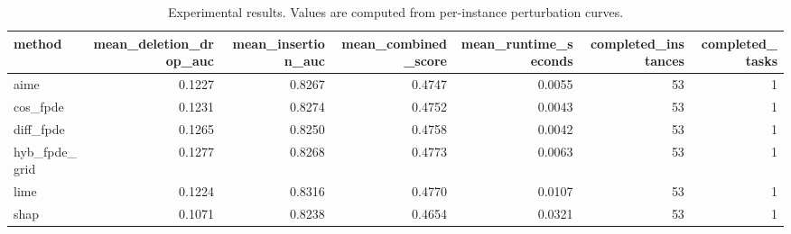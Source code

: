 \begin{table}[t]
\caption{Experimental results. Values are computed from per-instance perturbation curves.}
\label{tab:main_results_computed}
\centering
\begin{tabular}{lrrrrrr}
\toprule
method & mean\_deletion\_drop\_auc & mean\_insertion\_auc & mean\_combined\_score & mean\_runtime\_seconds & completed\_instances & completed\_tasks \\
\midrule
aime & 0.1227 & 0.8267 & 0.4747 & 0.0055 & 53 & 1 \\
cos\_fpde & 0.1231 & 0.8274 & 0.4752 & 0.0043 & 53 & 1 \\
diff\_fpde & 0.1265 & 0.8250 & 0.4758 & 0.0042 & 53 & 1 \\
hyb\_fpde\_grid & 0.1277 & 0.8268 & 0.4773 & 0.0063 & 53 & 1 \\
lime & 0.1224 & 0.8316 & 0.4770 & 0.0107 & 53 & 1 \\
shap & 0.1071 & 0.8238 & 0.4654 & 0.0321 & 53 & 1 \\
\bottomrule
\end{tabular}

\end{table}
